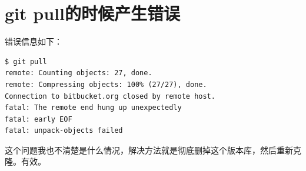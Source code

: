 \documentclass[a4paper,12pt]{ctexbook}
\begin{document}
\section{git pull的时候产生错误}
错误信息如下：
\begin{verbatim}
$ git pull
remote: Counting objects: 27, done.
remote: Compressing objects: 100% (27/27), done.
Connection to bitbucket.org closed by remote host.
fatal: The remote end hung up unexpectedly
fatal: early EOF
fatal: unpack-objects failed
\end{verbatim}
这个问题我也不清楚是什么情况，解决方法就是彻底删掉这个版本库，然后重新克隆。有效。
\end{document}
